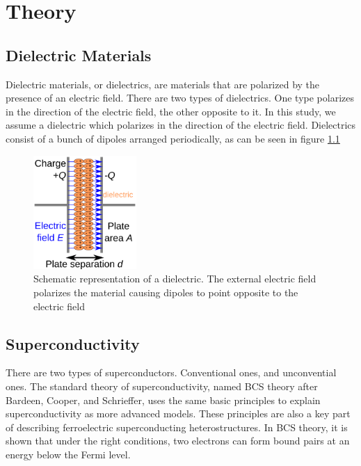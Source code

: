 \chapter{Theory}
\label{chapter:Theory}

\section{Dielectric Materials}
Dielectric materials, or dielectrics, are materials that are polarized by the presence of an electric field. There are two types of dielectrics. One type polarizes in the direction of the electric field, the other opposite to it. In this study, we assume a dielectric which polarizes in the direction of the electric field. Dielectrics consist of a bunch of dipoles arranged periodically, as can be seen in figure \ref{fig:dielectrics}

\begin{figure}[h]
    \centering
    \includegraphics[width=0.35\textwidth]{figures/dielectrics.png}
    \caption{Schematic representation of a dielectric. The external electric field polarizes the material causing dipoles to point opposite to the electric field}
    \label{fig:dielectrics}
\end{figure}

\section{Superconductivity}
There are two types of superconductors. Conventional ones, and unconvential ones.
The standard theory of superconductivity, named BCS theory after Bardeen, Cooper, and Schrieffer, uses the same basic principles to explain superconductivity as more advanced models. These principles are also a key part of describing ferroelectric superconducting heterostructures. In BCS theory, it is shown that under the right conditions, two electrons can form bound pairs at an energy below the Fermi level.


